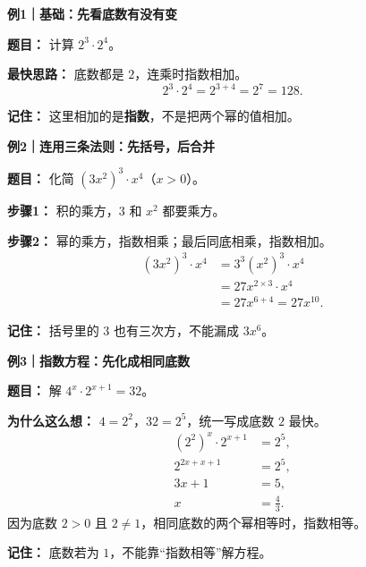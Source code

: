 \begin{examplebox}
    \textbf{\textcolor{CExample}{例1｜基础：先看底数有没有变}}\par
    \textbf{题目：} 计算 $2^3\cdot2^4$。\par
    \textbf{最快思路：} 底数都是 $2$，连乘时指数相加。
    \[2^3\cdot2^4=2^{3+4}=\boxed{2^7=128}.\]
    \begin{center}
    
    \end{center}
    \textbf{记住：} 这里相加的是\textbf{指数}，不是把两个幂的值相加。
\end{examplebox}

\begin{examplebox}
    \textbf{\textcolor{CExample}{例2｜连用三条法则：先括号，后合并}}\par
    \textbf{题目：} 化简 $(3x^2)^3\cdot x^4$（$x>0$）。\par
    \textbf{步骤1：} 积的乘方，$3$ 和 $x^2$ 都要乘方。\par
    \textbf{步骤2：} 幂的乘方，指数相乘；最后同底相乘，指数相加。
    \[
      \begin{aligned}
        (3x^2)^3\cdot x^4
        &=3^3(x^2)^3\cdot x^4\\
        &=27x^{2\times3}\cdot x^4\\
        &=\boxed{27x^{6+4}=27x^{10}}.
      \end{aligned}
    \]
    \begin{center}
    
    \end{center}
    \textbf{记住：} 括号里的 $3$ 也有三次方，不能漏成 $3x^6$。
\end{examplebox}

\begin{examplebox}
    \textbf{\textcolor{CExample}{例3｜指数方程：先化成相同底数}}\par
    \textbf{题目：} 解 $4^x\cdot2^{x+1}=32$。\par
    \textbf{为什么这么想：} $4=2^2$，$32=2^5$，统一写成底数 $2$ 最快。
    \[
      \begin{aligned}
        (2^2)^x\cdot2^{x+1}&=2^5,\\
        2^{2x+x+1}&=2^5,\\
        3x+1&=5,\\
        x&=\boxed{\frac43}.
      \end{aligned}
    \]
    因为底数 $2>0$ 且 $2\ne1$，相同底数的两个幂相等时，指数相等。
    \begin{center}
    
    \end{center}
    \textbf{记住：} 底数若为 $1$，不能靠“指数相等”解方程。
\end{examplebox}

